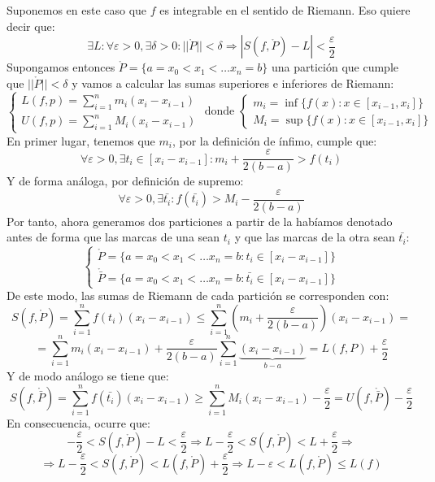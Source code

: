\documentclass[10pt,a4paper,openright]{book}
\begin{document}
\begin{itemize}
Suponemos en este caso que $f$ es integrable en el sentido de Riemann. Eso quiere decir que:
$$\exists L: \forall \varepsilon > 0, \exists \delta > 0 : ||\mathring{P}|| < \delta \Rightarrow |S(f, \mathring{P}) - L| < \frac{\varepsilon}{2}$$
Supongamos entonces $\mathring{P}= \{ a = x_0 < x_1 < \ldots  x_n = b\}$ una partición que cumple que $||\mathring{P}||<\delta$ y vamos a calcular las sumas superiores e inferiores de Riemann:
$$\begin{cases} L(f, p) = \displaystyle \sum_{i=1}^{n} m_i (x_i - x_{i-1})  \\ U(f, p) = \displaystyle \sum_{i=1}^{n} M_i (x_i - x_{i-1}) \end{cases} \mbox{ donde }	\begin{cases} m_i = \inf \{f(x): x\in [x_{i-1}, x_i]\} \\ M_i = \sup \{f(x): x\in [x_{i-1}, x_i]\} \end{cases}$$
En primer lugar, tenemos que $m_i$, por la definición de ínfimo, cumple que:
$$\forall \varepsilon > 0, \exists t_i \in [x_i - x_{i-1}]: m_i + \frac{\varepsilon}{2(b-a)} > f(t_i)$$
Y de forma análoga, por definición de supremo:
$$\forall \varepsilon > 0, \exists \bar{t_i}: f(\bar{t_i}) > M_i - \frac{\varepsilon}{2(b-a)}$$
Por tanto, ahora generamos dos particiones a partir de la habíamos denotado antes de forma que las marcas de una sean $t_i$ y que las marcas de la otra sean $\bar{t_i}$:
$$\begin{cases} \mathring{P} =\{ a = x_0 < x_1 < \ldots  x_n = b : t_i \in [x_i - x_{i-1}] \} \\ \mathring{\bar{P}} =\{ a = x_0 < x_1 < \ldots  x_n = b : \bar{t_i} \in [x_i - x_{i-1}] \} \end{cases}$$
De este modo, las sumas de Riemann de cada partición se corresponden con:
$$ S(f, \mathring{P}) = \sum_{i=1}^{n} f(t_i) (x_i - x_{i-1}) \leq \sum_{i=1}^{n} \left(m_i + \frac{\varepsilon}{2(b-a)}\right) (x_i - x_{i-1}) =$$
$$= \sum_{i=1}^{n} m_i (x_i - x_{i-1}) + \frac{\varepsilon}{2(b-a)} \sum_{i=1}^{n} \underbrace{(x_i - x_{i-1})}_{b-a} = L(f, P) + \frac{\varepsilon}{2}$$
Y de modo análogo se tiene que:
$$ S(f, \mathring{\bar{P}}) = \sum_{i=1}^{n} f(\bar{t_i}) (x_i - x_{i-1}) \geq \sum_{i=1}^{n} M_i (x_i - x_{i-1}) - \frac{\varepsilon}{2} = U(f,\mathring{\bar{P}})- \frac{\varepsilon}{2}$$
En consecuencia, ocurre que:
$$-\frac{\varepsilon}{2} < S(f, \mathring{P}) - L < \frac{\varepsilon}{2} \Rightarrow L-\frac{\varepsilon}{2} < S(f, \mathring{P}) < L+\frac{\varepsilon}{2} \Rightarrow $$
$$\Rightarrow L-\frac{\varepsilon}{2} < S(f, \mathring{P}) < L(f, \mathring{P})+\frac{\varepsilon}{2}\Rightarrow L - \varepsilon <  L(f, \mathring{P}) \leq L(f) $$

\end{itemize}
\end{document}
